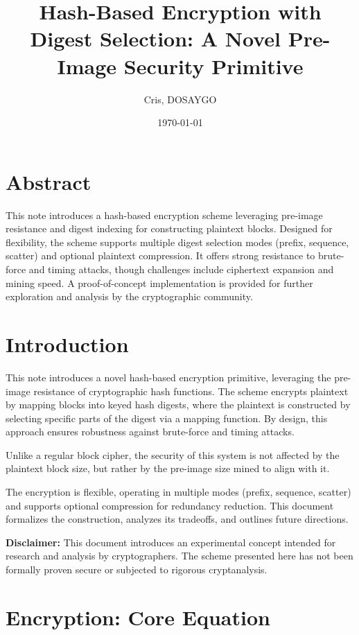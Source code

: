 \documentclass[11pt,a4paper]{article}
\title{Hash-Based Encryption with Digest Selection: A Novel Pre-Image Security Primitive}
\author{Cris, DOSAYGO}
\date{\today}
\begin{document}
\maketitle

\section*{Abstract}
This note introduces a hash-based encryption scheme leveraging pre-image resistance and digest indexing for constructing plaintext blocks. Designed for flexibility, the scheme supports multiple digest selection modes (prefix, sequence, scatter) and optional plaintext compression. It offers strong resistance to brute-force and timing attacks, though challenges include ciphertext expansion and mining speed. A proof-of-concept implementation is provided for further exploration and analysis by the cryptographic community.

\section*{Introduction}

This note introduces a novel hash-based encryption primitive, leveraging the pre-image resistance of cryptographic hash functions. The scheme encrypts plaintext by mapping blocks into keyed hash digests, where the plaintext is constructed by selecting specific parts of the digest via a mapping function. By design, this approach ensures robustness against brute-force and timing attacks.

Unlike a regular block cipher, the security of this system is not affected by the plaintext block size, but rather by the pre-image size mined to align with it.

The encryption is flexible, operating in multiple modes (prefix, sequence, scatter) and supports optional compression for redundancy reduction. This document formalizes the construction, analyzes its tradeoffs, and outlines future directions.

\textbf{Disclaimer:} This document introduces an experimental concept intended for research and analysis by cryptographers. The scheme presented here has not been formally proven secure or subjected to rigorous cryptanalysis.

\section*{Encryption: Core Equation}
\end{document}
